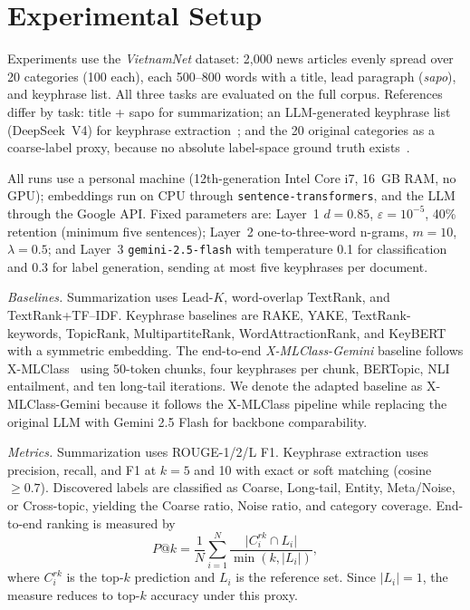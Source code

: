 \section{Experimental Setup}
\label{sec:setup}
Experiments use the \emph{VietnamNet} dataset: 2{,}000 news articles evenly spread over 20 categories (100 each), each 500--800 words with a title, lead paragraph (\emph{sapo}), and keyphrase list. All three tasks are evaluated on the full corpus. References differ by task: title + sapo for summarization; an LLM-generated keyphrase list (DeepSeek~V4) for keyphrase extraction~\cite{pavlovic2024effectiveness}; and the 20 original categories as a coarse-label proxy, because no absolute label-space ground truth exists~\cite{wan2024tnt}.

All runs use a personal machine (12th-generation Intel Core i7, 16~GB RAM, no GPU); embeddings run on CPU through \texttt{sentence-transformers}, and the LLM through the Google API. Fixed parameters are: Layer~1 $d=0.85$, $\varepsilon=10^{-5}$, 40\% retention (minimum five sentences); Layer~2 one-to-three-word n-grams, $m=10$, $\lambda=0.5$; and Layer~3 \texttt{gemini-2.5-flash} with temperature 0.1 for classification and 0.3 for label generation, sending at most five keyphrases per document.


\emph{Baselines.} Summarization uses Lead-$K$, word-overlap TextRank, and
TextRank+TF--IDF. Keyphrase baselines are RAKE, YAKE, TextRank-keywords, TopicRank,
MultipartiteRank, WordAttractionRank, and KeyBERT with a symmetric embedding. The
end-to-end \emph{X-MLClass-Gemini} baseline follows X-MLClass~\cite{li2024open} using
50-token chunks, four keyphrases per chunk, BERTopic, NLI entailment, and ten
long-tail iterations. We denote the adapted baseline as X-MLClass-Gemini because it
follows the X-MLClass pipeline while replacing the original LLM with Gemini 2.5 Flash
for backbone comparability.

\emph{Metrics.} Summarization uses ROUGE-1/2/L F1. Keyphrase extraction uses
precision, recall, and F1 at $k=5$ and 10 with exact or soft matching
(cosine $\geq0.7$). Discovered labels are classified as Coarse, Long-tail, Entity,
Meta/Noise, or Cross-topic, yielding the Coarse ratio, Noise ratio, and category
coverage. End-to-end ranking is measured by
\begin{equation}
P@k = \frac{1}{N}\sum_{i=1}^{N}
\frac{\lvert C_i^{rk}\cap L_i\rvert}{\min(k,\lvert L_i\rvert)},
\label{eq:pak}
\end{equation}
where $C_i^{rk}$ is the top-$k$ prediction and $L_i$ is the reference set. Since
$\lvert L_i\rvert=1$, the measure reduces to top-$k$ accuracy under this proxy.

